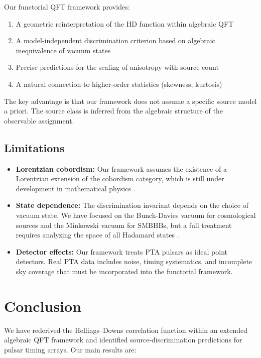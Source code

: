 \documentclass[11pt,a4paper]{article}
\begin{document}
Our functorial QFT framework provides:
\begin{enumerate}
\item A geometric reinterpretation of the HD function within algebraic QFT
\item A model-independent discrimination criterion based on algebraic inequivalence of vacuum states
\item Precise predictions for the scaling of anisotropy with source count
\item A natural connection to higher-order statistics (skewness, kurtosis)
\end{enumerate}

The key advantage is that our framework does not assume a specific source model a priori. The source class is inferred from the algebraic structure of the observable assignment.

\subsection{Limitations}\label{sec:limitations}

\begin{itemize}
\item \textbf{Lorentzian cobordism:} Our framework assumes the existence of a Lorentzian extension of the cobordism category, which is still under development in mathematical physics \cite{Schreiber:2023}.
\item \textbf{State dependence:} The discrimination invariant depends on the choice of vacuum state. We have focused on the Bunch-Davies vacuum for cosmological sources and the Minkowski vacuum for SMBHBs, but a full treatment requires analyzing the space of all Hadamard states \cite{Hollands:2003,Moretti:2017}.
\item \textbf{Detector effects:} Our framework treats PTA pulsars as ideal point detectors. Real PTA data includes noise, timing systematics, and incomplete sky coverage that must be incorporated into the functorial framework.
\end{itemize}

\section{Conclusion}\label{sec:conclusion}

We have rederived the Hellings--Downs correlation function within an extended algebraic QFT framework and identified source-discrimination predictions for pulsar timing arrays. Our main results are:
\end{document}

